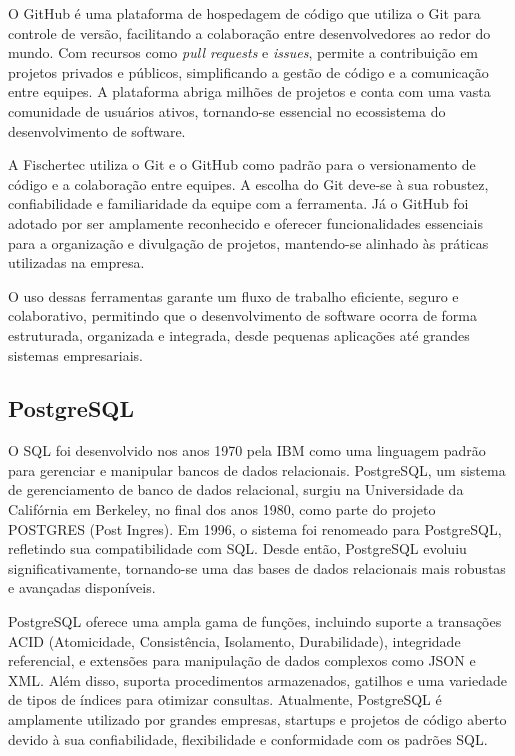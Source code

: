 O GitHub é uma plataforma de hospedagem de código que utiliza o Git para controle de versão, facilitando a colaboração entre desenvolvedores ao redor do mundo. Com recursos como \textit{pull requests} e \textit{issues}, permite a contribuição em projetos privados e públicos, simplificando a gestão de código e a comunicação entre equipes. A plataforma abriga milhões de projetos e conta com uma vasta comunidade de usuários ativos, tornando-se essencial no ecossistema do desenvolvimento de software.  

A Fischertec utiliza o Git e o GitHub como padrão para o versionamento de código e a colaboração entre equipes. A escolha do Git deve-se à sua robustez, confiabilidade e familiaridade da equipe com a ferramenta. Já o GitHub foi adotado por ser amplamente reconhecido e oferecer funcionalidades essenciais para a organização e divulgação de projetos, mantendo-se alinhado às práticas utilizadas na empresa.  

O uso dessas ferramentas garante um fluxo de trabalho eficiente, seguro e colaborativo, permitindo que o desenvolvimento de software ocorra de forma estruturada, organizada e integrada, desde pequenas aplicações até grandes sistemas empresariais.

\subsection{PostgreSQL}

O \acrlong{SQL} foi desenvolvido nos anos 1970 pela IBM como uma linguagem padrão para gerenciar e manipular bancos de dados relacionais. PostgreSQL, um sistema de gerenciamento de banco de dados relacional, surgiu na Universidade da Califórnia em Berkeley, no final dos anos 1980, como parte do projeto POSTGRES (Post Ingres). Em 1996, o sistema foi renomeado para PostgreSQL, refletindo sua compatibilidade com SQL. Desde então, PostgreSQL evoluiu significativamente, tornando-se uma das bases de dados relacionais mais robustas e avançadas disponíveis.

PostgreSQL oferece uma ampla gama de funções, incluindo suporte a transações ACID (Atomicidade, Consistência, Isolamento, Durabilidade), integridade referencial, e extensões para manipulação de dados complexos como JSON e XML. Além disso, suporta procedimentos armazenados, gatilhos e uma variedade de tipos de índices para otimizar consultas. Atualmente, PostgreSQL é amplamente utilizado por grandes empresas, startups e projetos de código aberto devido à sua confiabilidade, flexibilidade e conformidade com os padrões SQL.

